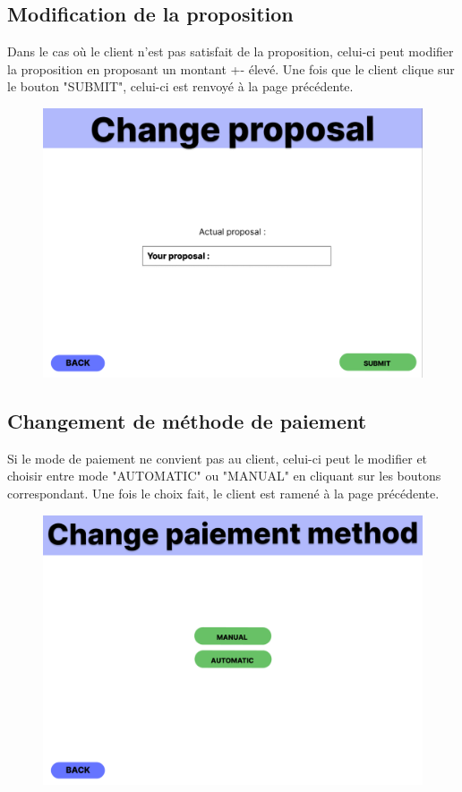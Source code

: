 \subsection{Modification de la proposition}
\begin{flushleft}
Dans le cas où le client n'est pas satisfait de la proposition, celui-ci peut modifier la proposition en proposant un montant +- élevé. Une fois que le client clique sur le bouton "SUBMIT", celui-ci est renvoyé à la page précédente.
\end{flushleft}
\begin{figure}[h]
\centering
\includegraphics[width = 1\textwidth]{extension-maxime/interface/img/proposal.png}
\end{figure}

\subsection{Changement de méthode de paiement}
\begin{flushleft}
Si le mode de paiement ne convient pas au client, celui-ci peut le modifier et choisir entre mode "AUTOMATIC" ou "MANUAL" en cliquant sur les boutons correspondant. Une fois le choix fait, le client est ramené à la page précédente.
\end{flushleft}
\begin{figure}[h]
\centering
\includegraphics[width = 1\textwidth]{extension-maxime/interface/img/paiement-method.png}
\end{figure}

